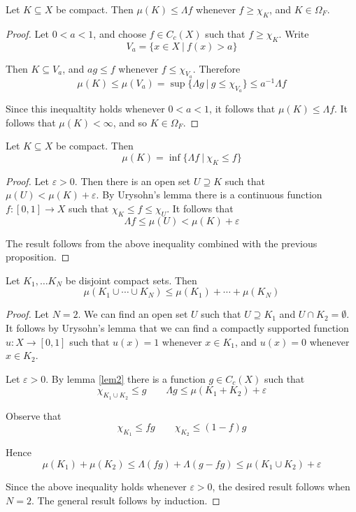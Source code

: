 \begin{proposition}
Let $K\subseteq X$ be compact.  Then $\mu (K)\leq \Lambda f$ whenever $f\geq \chi_K$, and $K\in \Omega_F$.
\end{proposition}

\begin{proof}
Let $0<a<1$, and choose $f\in C_c (X)$ such that $f\geq \chi_K$.  Write
$$V_a = \{ x\in X \ |\ f(x)>a \}$$

Then $K\subseteq V_a$, and $ag\leq f$ whenever $f\leq \chi_{V_a}$.  Therefore
$$\mu (K) \leq \mu (V_a ) = \sup \{ \Lambda g \ |\  g\leq \chi_{V_a} \} \leq a^{-1}\Lambda f$$

Since this inequaltity holds whenever $0<a<1$, it follows that $\mu (K)\leq \Lambda f$.  It follows that $\mu (K)< \infty$, and so $K\in \Omega_F$.
\end{proof}

\begin{lemma} \label{lem2}
Let $K\subseteq X$ be compact.  Then
$$\mu (K) =\inf \{ \Lambda f \ |\ \chi_K \leq f \}$$
\end{lemma}

\begin{proof}
Let $\varepsilon >0$.  Then there is an open set $U\supseteq K$ such that $\mu (U) < \mu (K) +\varepsilon$.  By Urysohn's lemma there is a continuous function $f\colon [0,1]\rightarrow X$ such that $\chi_K \leq f \leq \chi_U$.  It follows that
$$\Lambda f\leq \mu(U) < \mu (K) +\varepsilon$$

The result follows from the above inequality combined with the previous proposition.
\end{proof}

\begin{proposition} 
Let $K_1,\ldots K_N$ be disjoint compact sets.  Then
$$\mu (K_1 \cup \cdots \cup K_N) \leq \mu (K_1 ) + \cdots + \mu (K_N)$$
\end{proposition}

\begin{proof}
Let $N=2$.  We can find an open set $U$ such that $U\supseteq K_1$ and $U\cap K_2 = \emptyset$.  It follows by Urysohn's lemma that we can find a compactly supported function $u\colon X\rightarrow [0,1]$ such that $u(x)=1$ whenever $x\in K_1$, and $u(x) =0$ whenever $x\in K_2$.

Let $\varepsilon >0$.  By lemma \ref{lem2} there is a function $g\in C_c (X)$ such that
$$\chi_{K_1 \cup K_2}\leq g \qquad \Lambda g \leq \mu (K_1 + K_2) +\varepsilon$$

Observe that
$$\chi_{K_1} \leq fg \qquad \chi_{K_2} \leq (1-f)g$$

Hence
$$\mu (K_1 ) + \mu (K_2) \leq \Lambda (fg) + \Lambda (g-fg) \leq \mu (K_1 \cup K_2 ) + \varepsilon$$

Since the above inequality holds whenever $\varepsilon >0$, the desired result follows when $N=2$.  The general result follows by induction.
\end{proof}

